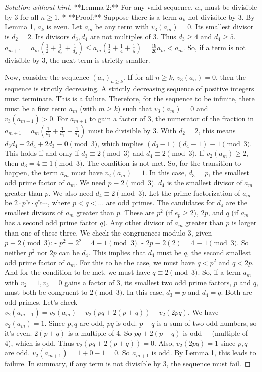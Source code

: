 \begin{proof} [Solution without hint]
**Lemma 2:** For any valid sequence, $a_n$ must be divisible by 3 for all $n \ge 1$.
*   **Proof:** Suppose there is a term $a_k$ not divisible by 3. By Lemma 1, $a_k$ is even.
    Let $a_m$ be any term with $v_3(a_m)=0$. Its smallest divisor is $d_2=2$. Its divisors $d_3, d_4$ are not multiples of 3. Thus $d_3 \ge 4$ and $d_4 \ge 5$.
    $a_{m+1} = a_m(\frac{1}{2}+\frac{1}{d_3}+\frac{1}{d_4}) \le a_m(\frac{1}{2}+\frac{1}{4}+\frac{1}{5}) = \frac{19}{20}a_m < a_m$.
    So, if a term is not divisible by 3, the next term is strictly smaller.

    Now, consider the sequence $(a_n)_{n \ge k}$.
    If for all $n \ge k$, $v_3(a_n)=0$, then the sequence is strictly decreasing. A strictly decreasing sequence of positive integers must terminate. This is a failure.
    Therefore, for the sequence to be infinite, there must be a first term $a_m$ (with $m \ge k$) such that $v_3(a_m)=0$ and $v_3(a_{m+1})>0$.
    For $a_{m+1}$ to gain a factor of 3, the numerator of the fraction in $a_{m+1} = a_m(\frac{1}{d_2}+\frac{1}{d_3}+\frac{1}{d_4})$ must be divisible by 3. With $d_2=2$, this means $d_3d_4+2d_4+2d_3 \equiv 0 \pmod 3$, which implies $(d_3-1)(d_4-1) \equiv 1 \pmod 3$. This holds if and only if $d_3 \equiv 2 \pmod 3$ and $d_4 \equiv 2 \pmod 3$.
    If $v_2(a_m) \ge 2$, then $d_3=4 \equiv 1 \pmod 3$. The condition is not met.
    So, for the transition to happen, the term $a_m$ must have $v_2(a_m)=1$.
    In this case, $d_3=p$, the smallest odd prime factor of $a_m$. We need $p \equiv 2 \pmod 3$.
    $d_4$ is the smallest divisor of $a_m$ greater than $p$. We also need $d_4 \equiv 2 \pmod 3$.
    Let the prime factorization of $a_m$ be $2 \cdot p^{e_p} \cdot q^{e_q} \cdots$, where $p < q < \dots$ are odd primes.
    The candidates for $d_4$ are the smallest divisors of $a_m$ greater than $p$. These are $p^2$ (if $e_p \ge 2$), $2p$, and $q$ (if $a_m$ has a second odd prime factor $q$). Any other divisor of $a_m$ greater than $p$ is larger than one of these three.
    We check the congruences modulo 3, given $p \equiv 2 \pmod 3$:
    - $p^2 \equiv 2^2 = 4 \equiv 1 \pmod 3$.
    - $2p \equiv 2(2) = 4 \equiv 1 \pmod 3$.
    So neither $p^2$ nor $2p$ can be $d_4$.
    This implies that $d_4$ must be $q$, the second smallest odd prime factor of $a_m$. For this to be the case, we must have $q < p^2$ and $q < 2p$. And for the condition to be met, we must have $q \equiv 2 \pmod 3$.
    So, if a term $a_m$ with $v_2=1, v_3=0$ gains a factor of 3, its smallest two odd prime factors, $p$ and $q$, must both be congruent to $2 \pmod 3$.
    In this case, $d_3=p$ and $d_4=q$. Both are odd primes.
    Let's check $v_2(a_{m+1}) = v_2(a_m) + v_2(pq+2(p+q)) - v_2(2pq)$.
    We have $v_2(a_m)=1$. Since $p, q$ are odd, $pq$ is odd. $p+q$ is a sum of two odd numbers, so it's even. $2(p+q)$ is a multiple of 4. So $pq+2(p+q)$ is odd + (multiple of 4), which is odd. Thus $v_2(pq+2(p+q)) = 0$. Also, $v_2(2pq) = 1$ since $p,q$ are odd.
    $v_2(a_{m+1}) = 1 + 0 - 1 = 0$.
    So $a_{m+1}$ is odd. By Lemma 1, this leads to failure.
    In summary, if any term is not divisible by 3, the sequence must fail.


\end{proof}
